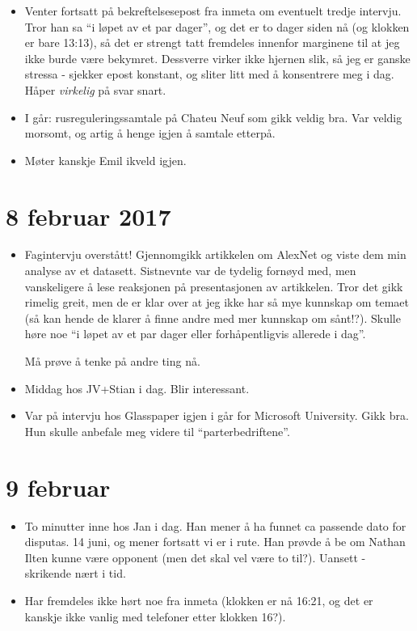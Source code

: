 \documentclass[11pt, norsk]{article}
\begin{document}
\begin{itemize}
  \item Venter fortsatt på bekreftelsesepost fra inmeta om eventuelt tredje intervju. Tror han sa ``i løpet av et par dager'', og det er to dager siden nå (og klokken er bare 13:13), så det er strengt tatt fremdeles innenfor marginene til at jeg ikke burde være bekymret. Dessverre virker ikke hjernen slik, så jeg er ganske stressa - sjekker epost konstant, og sliter litt med å konsentrere meg i dag. Håper \emph{virkelig} på svar snart.
  \item I går: rusreguleringssamtale på Chateu Neuf som gikk veldig bra. Var veldig morsomt, og artig å henge igjen å samtale etterpå.
  \item Møter kanskje Emil ikveld igjen.
\end{itemize}

\section{8 februar 2017} %
\label{sec:8_februar_2017}

\begin{itemize}
  \item Fagintervju overstått! Gjennomgikk artikkelen om AlexNet og viste dem min analyse av et datasett. Sistnevnte var de tydelig fornøyd med, men vanskeligere å lese reaksjonen på presentasjonen av artikkelen. Tror det gikk rimelig greit, men de er klar over at jeg ikke har så mye kunnskap om temaet (så kan hende de klarer å finne andre med mer kunnskap om sånt!?). Skulle høre noe ``i løpet av et par dager eller forhåpentligvis allerede i dag''. 

  Må prøve å tenke på andre ting nå.
  \item Middag hos JV+Stian i dag. Blir interessant. 
  \item Var på intervju hos Glasspaper igjen i går for Microsoft University. Gikk bra. Hun skulle anbefale meg videre til ``parterbedriftene''.
\end{itemize}

\section{9 februar} %
\label{sec:9_februar}

\begin{itemize}
  \item To minutter inne hos Jan i dag. Han mener å ha funnet ca passende dato for disputas. 14 juni, og mener fortsatt vi er i rute. Han prøvde å be om Nathan Ilten kunne være opponent (men det skal vel være to til?).  Uansett - skrikende nært i tid.
  \item Har fremdeles ikke hørt noe fra inmeta (klokken er nå 16:21, og det er kanskje ikke vanlig med telefoner etter klokken 16?).
\end{itemize}
\end{document}

